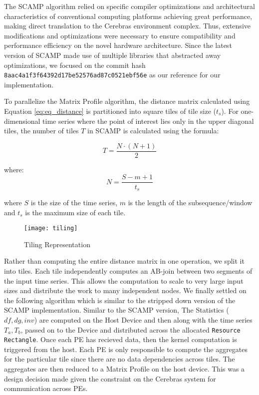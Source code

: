 The SCAMP algorithm relied on specific compiler optimizations and architectural characteristics of conventional computing platforms achieving great performance, making direct translation to the Cerebras environment complex. Thus, extensive modifications and optimizations were necessary to ensure compatibility and performance efficiency on the novel hardware architecture. Since the latest version of SCAMP made use of multiple libraries that abstracted away optimizations, we focused on the commit hash \texttt{8aac4a1f3f64392d17be52576ad87c0521ebf56e} as our reference for our implementation.

To parallelize the Matrix Profile algorithm, the distance matrix calculated using Equation \ref{eq:eq_distance} is partitioned into square tiles of tile size ($t_s$). For one-dimensional time series where the point of interest lies only in the upper diagonal tiles, the number of tiles \(T\) in SCAMP is calculated using the formula:

\begin{equation}
    T = \frac{N \cdot (N + 1)}{2}
    \label{eq:series_decomposition}
\end{equation}

where:
\[
N = \frac{S - m + 1}{t_s}
\]

where $S$ is the size of the time series, $m$ is the length of the subsequence/window and $t_s$ is the maximum size of each tile.


\begin{figure}[h!]
    \texttt{[image: tiling]}
    \centering
    \caption{Tiling Representation}
    \label{fig:tiling_rep}
\end{figure}

Rather than computing the entire distance matrix in one operation, we split it into tiles. Each tile independently computes an AB-join between two segments of the input time series. This allows the computation to scale to very large input sizes and distribute the work to many independent nodes.
We finally settled on the following algorithm which is similar to the stripped down version of the SCAMP implementation. Similar to the SCAMP version, The Statistics (\(df, dg, inv\)) are computed on the Host Device and then along with the time series \(T_a, T_b\), passed on to the Device and distributed across the allocated \texttt{Resource Rectangle}. Once each PE has recieved data, then the kernel computation is triggered from the host. Each PE is only responsible to compute the aggregates for the particular tile since there are no data dependencies across tiles. The aggregates are then reduced to a Matrix Profile on the host device. This was a design decision made given the constraint on the Cerebras system for communication across PEs.

